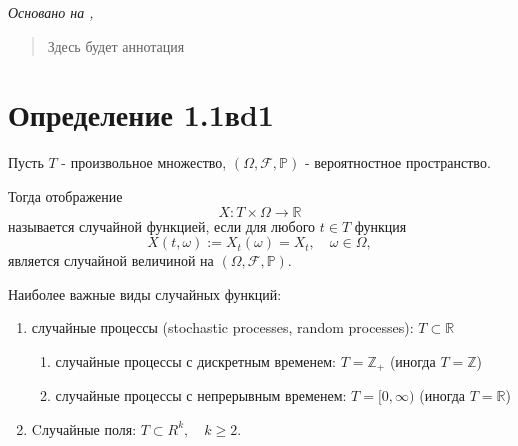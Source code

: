 \textit{Основано на \cite{adeshereKorrelyaciyaMezhduVremennymi2021},
\cite{panovTeoriyaSluchaynyhProcessov2018}}

\begin{quote}
  Здесь будет аннотация
\end{quote}

\section*{Определение 1.1вd1}

Пусть \( T \) - произвольное множество, \( (\Omega, \mathcal{F},
\mathbb{P}) \) - вероятностное пространство.

Тогда отображение \[ X : T \times \Omega \to \mathbb{R} \] называется
случайной функцией, если для
любого \( t \in T \) функция \[ X(t, \omega) := X_t(\omega) = X_t,
\quad \omega \in \Omega, \]  является случайной величиной на \(
(\Omega, \mathcal{F}, \mathbb{P}) \).

Наиболее важные виды случайных функций:
\begin{enumerate}
  \item случайные процессы (stochastic processes, random processes):
    \( T \subset \mathbb{R} \)
    \begin{enumerate}
      \item случайные процессы с дискретным временем: \( T =
        \mathbb{Z}_+ \) (иногда \( T = \mathbb{Z} \))
      \item случайные процессы с непрерывным временем: \( T = [0,
        \infty) \) (иногда \( T = \mathbb{R} \))
    \end{enumerate}
  \item Cлучайные поля: \( T \subset R^k, \quad k \geq 2 \).
\end{enumerate}




